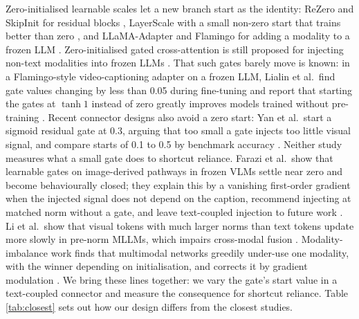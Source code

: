 Zero-initialised learnable scales let a new branch start as the identity: ReZero and SkipInit for residual blocks
\citep{bachlechner2021rezero,de2020skipinit}, LayerScale with a small non-zero start that trains better than zero
\citep{touvron2021cait}, and LLaMA-Adapter and Flamingo for adding a modality to a frozen LLM \citep{zhang2024llamaadapter,alayrac2022flamingo}. Zero-initialised gated cross-attention is still proposed for injecting non-text modalities into
frozen LLMs \citep{rm2026zerogated}. That such gates barely move is known: in a Flamingo-style video-captioning adapter
on a frozen LLM, Lialin et al.~find gate values changing by less than 0.05 during fine-tuning and report that
starting the gates at \(\tanh 1\) instead of zero greatly improves models trained without pre-training
\citep{lialin2023scalable}. Recent connector designs also avoid a zero start: Yan et al.~start a sigmoid residual gate at
0.3, arguing that too small a gate injects too little visual signal, and compare starts of 0.1 to 0.5 by benchmark
accuracy \citep{yan2026dgp}. Neither study measures what a small gate does to shortcut reliance. Farazi et al.~show that learnable gates on image-derived pathways in frozen VLMs settle near
zero and become behaviourally closed; they explain this by a vanishing first-order gradient when the injected signal
does not depend on the caption, recommend injecting at matched norm without a gate, and leave text-coupled injection
to future work \citep{farazi2026gate}. Li et al.~show that visual tokens with much larger norms than
text tokens update more slowly in pre-norm MLLMs, which impairs cross-modal fusion \citep{li2025unseen}. Modality-imbalance work finds that multimodal
networks greedily under-use one modality, with the winner depending on initialisation, and corrects it by gradient
modulation \citep{wu2022greedy,huang2022modality,peng2022balanced}. We bring these lines together: we vary the gate's
start value in a text-coupled connector and measure the consequence for shortcut reliance. Table \ref{tab:closest} sets out how our
design differs from the closest studies.

